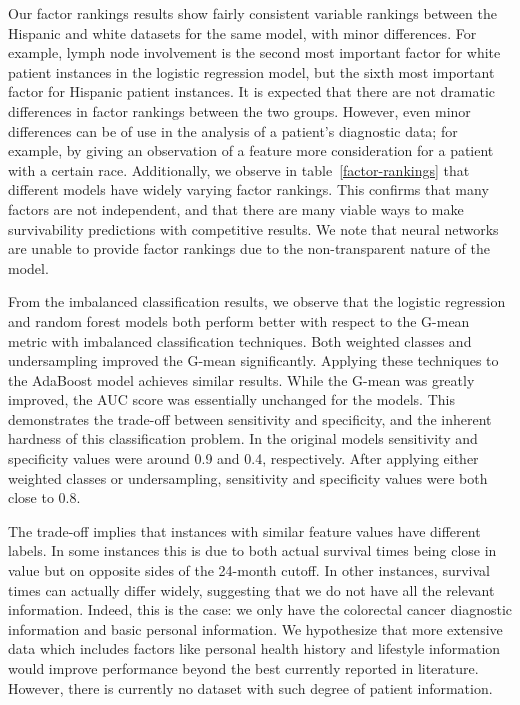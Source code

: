 \documentclass[review]{elsarticle}
\begin{document}
Our factor rankings results show fairly consistent variable rankings between the Hispanic and white datasets for the same model, with minor differences. For example, lymph node involvement is the second most important factor for white patient instances in the logistic regression model, but the sixth most important factor for Hispanic patient instances. It is expected that there are not dramatic differences in factor rankings between the two groups. However, even minor differences can be of use in the analysis of a patient’s diagnostic data; for example, by giving an observation of a feature more consideration for a patient with a certain race. Additionally, we observe in table~\ref{factor-rankings} that different models have widely varying factor rankings. This confirms that many factors are not independent, and that there are many viable ways to make survivability predictions with competitive results. We note that neural networks are unable to provide factor rankings due to the non-transparent nature of the model.



From the imbalanced classification results, we observe that the logistic regression and random forest models both perform better with respect to the G-mean metric with imbalanced classification techniques. Both weighted classes and undersampling improved the G-mean significantly. Applying these techniques to the AdaBoost model achieves similar results. While the G-mean was greatly improved, the AUC score was essentially unchanged for the models. This demonstrates the trade-off between sensitivity and specificity, and the inherent hardness of this classification problem. In the original models sensitivity and specificity values were around 0.9 and 0.4, respectively. After applying either weighted classes or undersampling, sensitivity and specificity values were both close to 0.8. 

The trade-off implies that instances with similar feature values have different labels. In some instances this is due to both actual survival times being close in value but on opposite sides of the 24-month cutoff. In other instances, survival times can actually differ widely, suggesting that we do not have all the relevant information. Indeed, this is the case: we only have the colorectal cancer diagnostic information and basic personal information. We hypothesize that more extensive data which includes factors like personal health history and lifestyle information would improve performance beyond the best currently reported in literature. However, there is currently no dataset with such degree of patient information.
\end{document}
